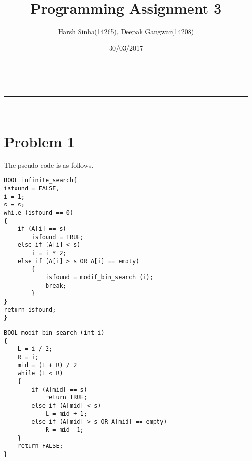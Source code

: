 \documentclass[a4paper,11pt]{article}
\makeatletter
\newcommand{\linia}{\rule{\linewidth}{0.5pt}}
\theoremstyle{mytheor}
\renewcommand{\maketitle}{
\begin{center}
\vspace{2ex}
{\huge \textsc{\@title}}
\vspace{1ex}
\\
\linia\\
\@author \hfill \@date
\vspace{4ex}
\end{center}
}
\makeatother
\begin{document}
\title{Programming Assignment \textnumero{} 3}

\author{Harsh Sinha(14265), Deepak Gangwar(14208)}

\date{30/03/2017}

\maketitle

\section*{Problem 1}

The pseudo code is as follows.

\begin{lstlisting}[label={list:first},caption=Pseudo code -- Search in an Infinite Array.]
BOOL infinite_search{
isfound = FALSE;
i = 1;
s = s;
while (isfound == 0)
{
	if (A[i] == s)
		isfound = TRUE;
	else if (A[i] < s)
		i = i * 2;
	else if (A[i] > s OR A[i] == empty)
		{
			isfound = modif_bin_search (i);
			break;
		}
}
return isfound;
}
\end{lstlisting}

\begin{lstlisting}[caption=modif\_bin\_search.]
BOOL modif_bin_search (int i)
{
	L = i / 2;
	R = i;
	mid = (L + R) / 2
	while (L < R)
	{
		if (A[mid] == s)
			return TRUE;
		else if (A[mid] < s)
			L = mid + 1;
		else if (A[mid] > s OR A[mid] == empty)
			R = mid -1;	
	}
	return FALSE;
}
\end{lstlisting}
\end{document}
